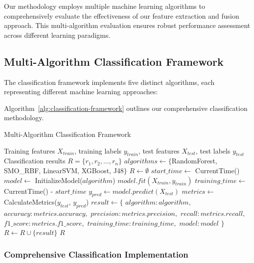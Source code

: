 Our methodology employs multiple machine learning algorithms to comprehensively evaluate the effectiveness of our feature extraction and fusion approach. This multi-algorithm evaluation ensures robust performance assessment across different learning paradigms.

\subsection{Multi-Algorithm Classification Framework}
\label{subsec:multi-algorithm}

The classification framework implements five distinct algorithms, each representing different machine learning approaches:

Algorithm~\ref{alg:classification-framework} outlines our comprehensive classification methodology.

\begin{algorithm}[!htbp]
\caption{Multi-Algorithm Classification Framework}
\label{alg:classification-framework}
\begin{algorithmic}[1]
\Require Training features $X_{train}$, training labels $y_{train}$, test features $X_{test}$, test labels $y_{test}$
\Ensure Classification results $R = \{r_1, r_2, ..., r_n\}$
\State $algorithms \leftarrow \{$RandomForest, SMO\_RBF, LinearSVM, XGBoost, J48$\}$
\State $R \leftarrow \emptyset$
    \State $start\_time \leftarrow$ CurrentTime()
    \State $model \leftarrow$ InitializeModel($algorithm$)
    \State $model.fit(X_{train}, y_{train})$
    \State $training\_time \leftarrow$ CurrentTime() - $start\_time$
    \State $y_{pred} \leftarrow model.predict(X_{test})$
    \State $metrics \leftarrow$ CalculateMetrics($y_{test}$, $y_{pred}$)
    \State $result \leftarrow \{$
    \State \quad $algorithm: algorithm,$
    \State \quad $accuracy: metrics.accuracy,$
    \State \quad $precision: metrics.precision,$
    \State \quad $recall: metrics.recall,$
    \State \quad $f1\_score: metrics.f1\_score,$
    \State \quad $training\_time: training\_time,$
    \State \quad $model: model$
    \State $\}$
    \State $R \leftarrow R \cup \{result\}$
\EndFor
\Return $R$
\end{algorithmic}
\end{algorithm}

\subsubsection{Comprehensive Classification Implementation}


